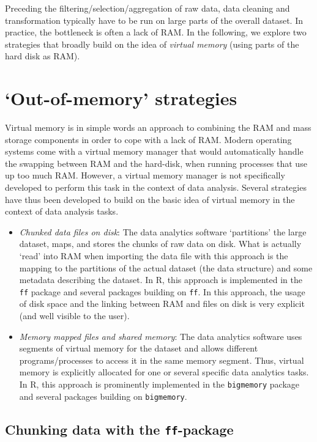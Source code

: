 \documentclass[
  12pt,
]{style/krantz}
\begin{document}
Preceding the filtering/selection/aggregation of raw data, data cleaning and transformation typically have to be run on large parts of the overall dataset. In practice, the bottleneck is often a lack of RAM. In the following, we explore two strategies that broadly build on the idea of \emph{virtual memory} (using parts of the hard disk as RAM).

\hypertarget{out-of-memory-strategies}{%
\section{`Out-of-memory' strategies}\label{out-of-memory-strategies}}

Virtual memory is in simple words an approach to combining the RAM and mass storage components in order to cope with a lack of RAM. Modern operating systems come with a virtual memory manager that would automatically handle the swapping between RAM and the hard-disk, when running processes that use up too much RAM. However, a virtual memory manager is not specifically developed to perform this task in the context of data analysis. Several strategies have thus been developed to build on the basic idea of virtual memory in the context of data analysis tasks.

\begin{itemize}
\item
  \emph{Chunked data files on disk}: The data analytics software `partitions' the large dataset, maps, and stores the chunks of raw data on disk. What is actually `read' into RAM when importing the data file with this approach is the mapping to the partitions of the actual dataset (the data structure) and some metadata describing the dataset. In R, this approach is implemented in the \texttt{ff} package and several packages building on \texttt{ff}. In this approach, the usage of disk space and the linking between RAM and files on disk is very explicit (and well visible to the user).
\item
  \emph{Memory mapped files and shared memory}: The data analytics software uses segments of virtual memory for the dataset and allows different programs/processes to access it in the same memory segment. Thus, virtual memory is explicitly allocated for one or several specific data analytics tasks. In R, this approach is prominently implemented in the \texttt{bigmemory} package and several packages building on \texttt{bigmemory}.
\end{itemize}

\hypertarget{chunking-data-with-the-ff-package}{%
\subsection{\texorpdfstring{Chunking data with the \texttt{ff}-package}{Chunking data with the ff-package}}\label{chunking-data-with-the-ff-package}}
\end{document}
